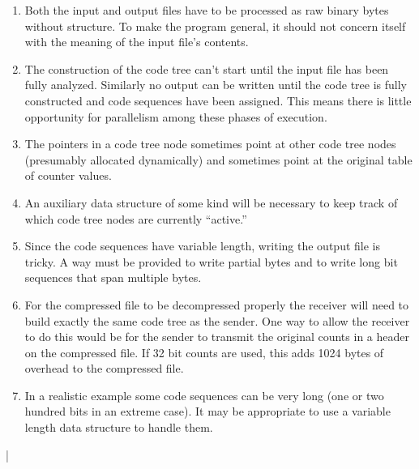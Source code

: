 \documentclass{scrreprt}
\begin{document}
\begin{enumerate}

\item Both the input and output files have to be processed as raw binary bytes without
  structure. To make the program general, it should not concern itself with the meaning of the
  input file's contents.

\item The construction of the code tree can't start until the input file has been fully
  analyzed. Similarly no output can be written until the code tree is fully constructed and code
  sequences have been assigned. This means there is little opportunity for parallelism among
  these phases of execution.

\item The pointers in a code tree node sometimes point at other code tree nodes (presumably
  allocated dynamically) and sometimes point at the original table of counter values.

\item An auxiliary data structure of some kind will be necessary to keep track of which code
  tree nodes are currently ``active.''

\item Since the code sequences have variable length, writing the output file is tricky. A way
  must be provided to write partial bytes and to write long bit sequences that span multiple
  bytes.

\item For the compressed file to be decompressed properly the receiver will need to build
  exactly the same code tree as the sender. One way to allow the receiver to do this would be
  for the sender to transmit the original counts in a header on the compressed file. If 32 bit
  counts are used, this adds 1024 bytes of overhead to the compressed file.

\item In a realistic example some code sequences can be very long (one or two hundred bits in an
  extreme case). It may be appropriate to use a variable length data structure to handle them.

\end{enumerate}

\lstDeleteShortInline|

%
%
%
%
%
%
%
\end{document}
